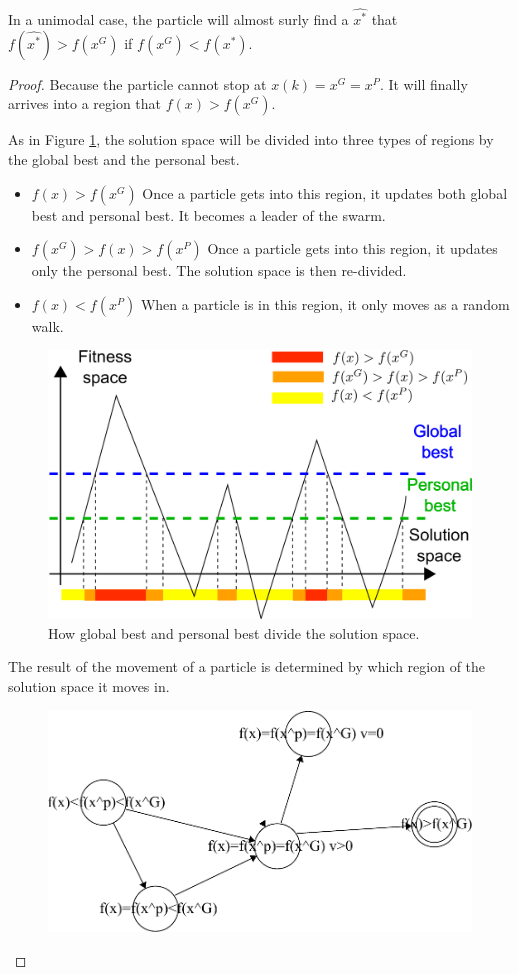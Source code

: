 \begin{mythm}
\label{thm:singleHill:particle:better}
In a unimodal case, the particle will almost surly find a $ \hat{x^{*}} $ that $ f(\hat{x^{*}}) > f(x^{G}) $ if $ f( x^{G} ) < f( x^{*}) $.
\begin{proof}
Because the particle cannot stop at $ x(k) = x^{G} = x^{P} $.
It will finally arrives into a region that $ f(x) > f(x^{G}) $.

As in Figure \ref{fig:categorize_regions}, the solution space will be divided into three types of regions by the global best and the personal best.
\begin{itemize}
\item $ f(x) > f(x^G) $
Once a particle gets into this region, it updates both global best and personal best. 
It becomes a leader of the swarm.
\item $ f(x^{G}) > f(x) > f(x^{P}) $
Once a particle gets into this region, it updates only the personal best.
The solution space is then re-divided.
\item $ f(x) < f(x^{P}) $
When a particle is in this region, it only moves as a random walk.
\end{itemize}

\begin{figure}
\centering
\includegraphics[width=0.7\linewidth]{./fig/categorize_regions}
\caption{How global best and personal best divide the solution space.}
\label{fig:categorize_regions}
\end{figure}

The result of the movement of a particle is determined by which region of the solution space it moves in.

\begin{figure}[tbph]
\centering
\includegraphics[width=0.7\linewidth]{./fig/fsm}
\caption{}
\label{fig:fsm}
\end{figure}

\end{proof}
\end{mythm}

